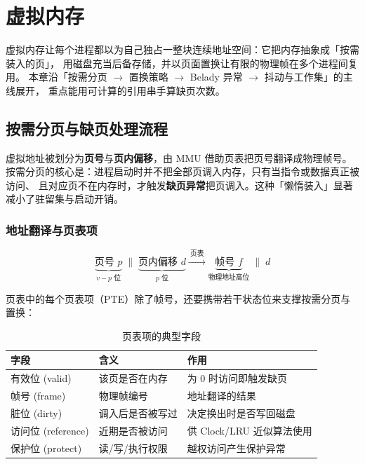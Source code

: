 \clearpage
\begingroup
\let\clearpage\relax
\let\cleardoublepage\relax
\vspace*{\fill}
\chapter{虚拟内存}
\begin{center}
虚拟内存让每个进程都以为自己独占一整块连续地址空间：它把内存抽象成「按需装入的页」，
用磁盘充当后备存储，并以页面置换让有限的物理帧在多个进程间复用。
本章沿「按需分页 $\to$ 置换策略 $\to$ Belady 异常 $\to$ 抖动与工作集」的主线展开，
重点能用可计算的引用串手算缺页次数。
\end{center}
\vspace*{\fill}
\endgroup
\clearpage

\section{按需分页与缺页处理流程}

虚拟地址被划分为\textbf{页号}与\textbf{页内偏移}，由 MMU 借助页表把页号翻译成物理帧号。
按需分页的核心是：进程启动时并不把全部页调入内存，只有当指令或数据真正被访问、
且对应页不在内存时，才触发\textbf{缺页异常}把页调入。这种「懒惰装入」显著减小了驻留集与启动开销。

\subsection{地址翻译与页表项}

\begin{equation}
    \underbrace{\text{页号 } p}_{v-p \text{ 位}} \;\|\; \underbrace{\text{页内偏移 } d}_{p \text{ 位}}
    \xrightarrow{\ \text{页表}\ } \underbrace{\text{帧号 } f}_{\text{物理地址高位}} \;\|\; d
\end{equation}

页表中的每个页表项（PTE）除了帧号，还要携带若干状态位来支撑按需分页与置换：

\begin{table}[H]
\centering
\caption{页表项的典型字段}
\begin{tabulary}{\textwidth}{LLL}
\toprule
字段 & 含义 & 作用 \\
\midrule
有效位 (valid) & 该页是否在内存 & 为 0 时访问即触发缺页 \\
帧号 (frame) & 物理帧编号 & 地址翻译的结果 \\
脏位 (dirty) & 调入后是否被写过 & 决定换出时是否写回磁盘 \\
访问位 (reference) & 近期是否被访问 & 供 Clock/LRU 近似算法使用 \\
保护位 (protect) & 读/写/执行权限 & 越权访问产生保护异常 \\
\bottomrule
\end{tabulary}
\end{table}

